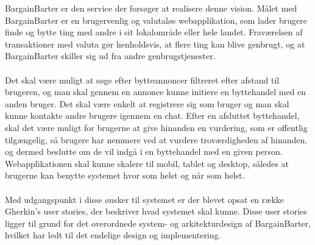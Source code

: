 \noindent BargainBarter er den service der forsøger at realisere denne vision. 
Målet med BargainBarter er en brugervenlig og valutaløs webapplikation, som lader brugere finde og bytte ting med andre i sit lokalområde eller hele landet. Fraværelsen af transaktioner med valuta gør henholdsvis, at flere ting kan blive genbrugt, og at BargainBarter skiller sig ud fra andre genbrugstjenester. \\ \\ \noindent
  Det skal være muligt at søge efter bytteannoncer filtreret efter afstand til brugeren, og man skal gennem en annonce kunne initiere en byttehandel med en anden bruger. Det skal være enkelt at registrere sig som bruger og man skal kunne kontakte andre brugere igennem en chat. Efter en afsluttet byttehandel, skal det være muligt for brugerne at give hinanden en vurdering, som er offentlig tilgængelig, så brugere har nemmere ved at vurdere troværdigheden af hinanden, og dermed beslutte om de vil indgå i en byttehandel med en given person. Webapplikationen skal kunne skalere til mobil, tablet og desktop, således at brugerne kan benytte systemet hvor som helst og når som helst.  \\ \\ \noindent
Med udgangspunkt i disse ønsker til systemet er der blevet opsat en række Gherkin's user stories\cite{Gherkin}, der beskriver hvad systemet skal kunne. Disse user stories ligger til grund for det overordnede system- og arkitekturdesign af BargainBarter, hvilket har ledt til det endelige design og implementering.  

